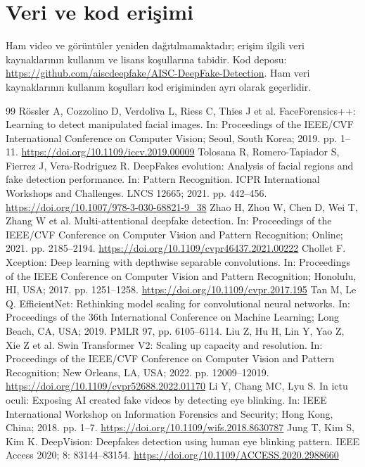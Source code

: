\documentclass[a4paper]{elektr}
\begin{document}
\section*{Veri ve kod erişimi}
Ham video ve görüntüler yeniden dağıtılmamaktadır; erişim ilgili veri kaynaklarının kullanım ve lisans koşullarına tabidir. Kod deposu: \url{https://github.com/aiscdeepfake/AISC-DeepFake-Detection}. Ham veri kaynaklarının kullanım koşulları kod erişiminden ayrı olarak geçerlidir.
\FloatBarrier
\begin{thebibliography}{99}
 Rössler A, Cozzolino D, Verdoliva L, Riess C, Thies J et al. FaceForensics++: Learning to detect manipulated facial images. In: Proceedings of the IEEE/CVF International Conference on Computer Vision; Seoul, South Korea; 2019. pp. 1--11. \url{https://doi.org/10.1109/iccv.2019.00009}
 Tolosana R, Romero-Tapiador S, Fierrez J, Vera-Rodriguez R. DeepFakes evolution: Analysis of facial regions and fake detection performance. In: Pattern Recognition. ICPR International Workshops and Challenges. LNCS 12665; 2021. pp. 442--456. \url{https://doi.org/10.1007/978-3-030-68821-9_38}
 Zhao H, Zhou W, Chen D, Wei T, Zhang W et al. Multi-attentional deepfake detection. In: Proceedings of the IEEE/CVF Conference on Computer Vision and Pattern Recognition; Online; 2021. pp. 2185--2194. \url{https://doi.org/10.1109/cvpr46437.2021.00222}
 Chollet F. Xception: Deep learning with depthwise separable convolutions. In: Proceedings of the IEEE Conference on Computer Vision and Pattern Recognition; Honolulu, HI, USA; 2017. pp. 1251--1258. \url{https://doi.org/10.1109/cvpr.2017.195}
 Tan M, Le Q. EfficientNet: Rethinking model scaling for convolutional neural networks. In: Proceedings of the 36th International Conference on Machine Learning; Long Beach, CA, USA; 2019. PMLR 97, pp. 6105--6114.
 Liu Z, Hu H, Lin Y, Yao Z, Xie Z et al. Swin Transformer V2: Scaling up capacity and resolution. In: Proceedings of the IEEE/CVF Conference on Computer Vision and Pattern Recognition; New Orleans, LA, USA; 2022. pp. 12009--12019. \url{https://doi.org/10.1109/cvpr52688.2022.01170}
 Li Y, Chang MC, Lyu S. In ictu oculi: Exposing AI created fake videos by detecting eye blinking. In: IEEE International Workshop on Information Forensics and Security; Hong Kong, China; 2018. pp. 1--7. \url{https://doi.org/10.1109/wifs.2018.8630787}
 Jung T, Kim S, Kim K. DeepVision: Deepfakes detection using human eye blinking pattern. IEEE Access 2020; 8: 83144--83154. \url{https://doi.org/10.1109/ACCESS.2020.2988660}

\end{thebibliography}
\end{document}
